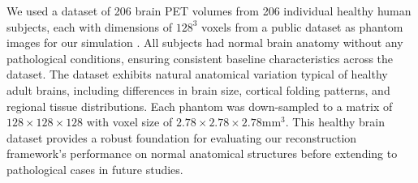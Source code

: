 \documentclass[aps,prb,preprint,groupedaddress,showkeys]{revtex4}
\begin{document}





We used a dataset of 206 brain PET volumes from 206 individual healthy human subjects, each with dimensions of $128^3$ voxels from a public dataset as phantom images for our simulation \cite{Han2023DiffusionPET}. All subjects had normal brain anatomy without any pathological conditions, ensuring consistent baseline characteristics across the dataset. The dataset exhibits natural anatomical variation typical of healthy adult brains, including differences in brain size, cortical folding patterns, and regional tissue distributions. Each phantom was down-sampled to a matrix of $128 \times 128 \times 128$ with voxel size of $2.78 \times 2.78 \times 2.78$mm$^3$. This healthy brain dataset provides a robust foundation for evaluating our reconstruction framework's performance on normal anatomical structures before extending to pathological cases in future studies.
\end{document}
